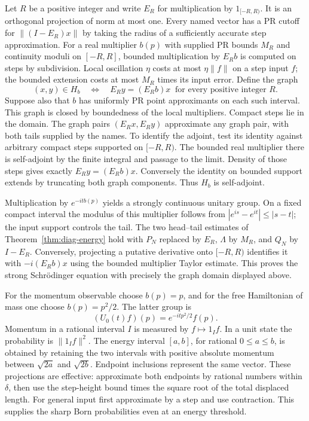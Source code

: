 Let $R$ be a positive integer and write $E_R$ for multiplication by
$1_{[-R,R)}$. It is an orthogonal projection of norm at most one.
Every named vector has a PR cutoff for $\|(I-E_R)x\|$ by taking the
radius of a sufficiently accurate step approximation.
For a real multiplier $b(p)$ with supplied PR bounds $M_R$ and
continuity moduli on $[-R,R]$, bounded multiplication by $E_Rb$
is computed on steps by subdivision. Local oscillation $\eta$ costs
at most $\eta\|f\|$ on a step input $f$; the bounded extension
costs at most $M_R$ times its input error. Define the graph
\[
 (x,y)\in H_b \quad\Longleftrightarrow\quad
 E_Ry=(E_Rb)x\ \text{ for every positive integer }R.
\]
Suppose also that $b$ has uniformly PR point approximants on each such
interval. This graph is closed by boundedness of the local multipliers.
Compact steps lie in the domain. The graph pairs
$(E_Rx,E_Ry)$ approximate any graph pair, with both tails supplied
by the names. To identify the adjoint, test its identity against
arbitrary compact steps supported on $[-R,R)$. The bounded real
multiplier there is self-adjoint by the finite integral and passage to
the limit. Density of those steps gives exactly $E_Ry=(E_Rb)x$.
Conversely the identity on bounded support extends by truncating both
graph components. Thus $H_b$ is self-adjoint.

Multiplication by $e^{-itb(p)}$ yields a strongly continuous unitary
group. On a fixed compact interval the modulus of this multiplier follows
from $|e^{is}-e^{it}|\le |s-t|$; the input support controls the tail.
The two head--tail estimates of Theorem~\ref{thm:diag-energy} hold
with $P_N$ replaced by $E_R$, $\Lambda$ by $M_R$, and $Q_N$ by $I-E_R$.
Conversely, projecting a putative derivative onto $[-R,R)$ identifies
it with $-i(E_Rb)x$ using the bounded multiplier Taylor estimate.
This proves the strong Schr\"odinger equation with precisely the graph
domain displayed above.

For the momentum observable choose $b(p)=p$, and for the free
Hamiltonian of mass one choose $b(p)=p^2/2$. The latter group is
\[
  (U_0(t)f)(p)=e^{-itp^2/2}f(p).
\]
Momentum in a rational interval $I$ is measured by $f\mapsto1_I f$.
In a unit state the probability is $\|1_I f\|^2$. The energy interval
$[a,b]$, for rational $0\le a\le b$, is obtained by retaining the
two intervals with positive absolute momentum between $\sqrt{2a}$
and $\sqrt{2b}$. Endpoint inclusions represent the same vector.
These projections are effective: approximate both endpoints by rational
numbers within $\delta$, then use the step-height bound times the square
root of the total displaced length. For general input first approximate
by a step and use contraction. This supplies the sharp Born probabilities
even at an energy threshold.

